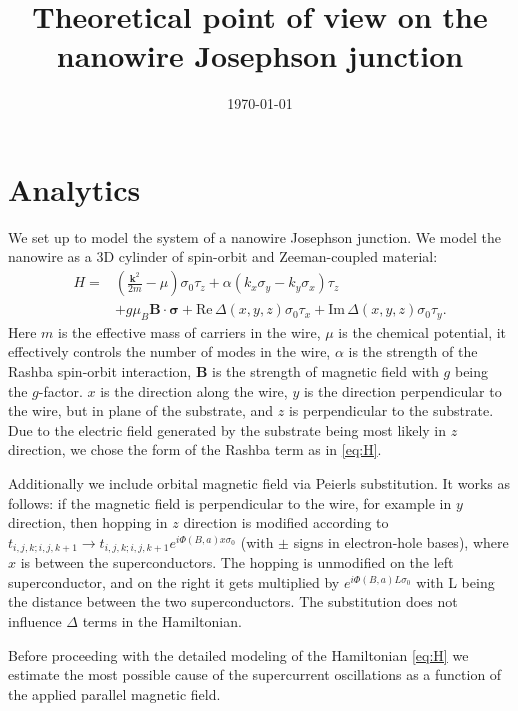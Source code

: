 \documentclass[
10pt, %
a4paper, %
oneside, %
BCOR5mm, %
]{scrartcl}
\title{Theoretical point of view on the nanowire Josephson junction}
\date{\today}
\begin{document}
\maketitle

\section{Analytics}

We set up to model the system of a nanowire Josephson junction. We model the nanowire as a 3D cylinder of spin-orbit and Zeeman-coupled material:
\begin{align}
H = &\left(\frac{\mathbf{k}^2}{2m}-\mu\right)\sigma_0 \tau_z + \alpha (k_x \sigma_y - k_y \sigma_x)\tau_z \nonumber \\ &+ g \mu_B \mathbf{B}\cdot\boldsymbol{\sigma} + \mathrm{Re}\,\Delta(x, y, z) \sigma_0 \tau_x + \mathrm{Im}\,\Delta(x, y, z) \sigma_0 \tau_y.\label{eq:H}
\end{align}
Here $m$ is the effective mass of carriers in the wire, $\mu$ is the chemical potential, it effectively controls the number of modes in the wire, $\alpha$ is the strength of the Rashba spin-orbit interaction, $\mathbf{B}$ is the strength of magnetic field with $g$ being the $g$-factor. $x$ is the direction along the wire, $y$ is the direction perpendicular to the wire, but in plane of the substrate, and $z$ is perpendicular to the substrate. Due to the electric field generated by the substrate being most likely in $z$ direction, we chose the form of the Rashba term as in \eqref{eq:H}.

Additionally we include orbital magnetic field via Peierls substitution. It works as follows: if the magnetic field is perpendicular to the wire, for example in $y$ direction, then hopping in $z$ direction is modified according to $t_{i,j,k;i,j,k+1} \to t_{i,j,k;i,j,k+1} e^{i \Phi(B, a) x\sigma_0}$ (with $\pm$ signs in electron-hole bases), where $x$ is between the superconductors. The hopping is unmodified on the left superconductor, and on the right it gets multiplied by $e^{i \Phi(B, a) L\sigma_0}$ with L being the distance between the two superconductors. The substitution does not influence $\Delta$ terms in the Hamiltonian.

Before proceeding with the detailed modeling of the Hamiltonian \eqref{eq:H} we estimate the most possible cause of the supercurrent oscillations as a function of the applied parallel magnetic field. 
\end{document}
